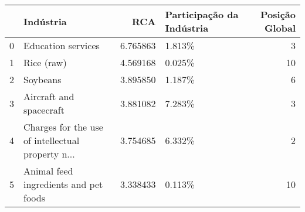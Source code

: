 \begin{tabular}{llrlr}
\toprule
{} &                                          Indústria &       RCA & Participação da Indústria &  Posição Global \\
\midrule
0 &                                 Education services &  6.765863 &                    1.813\% &               3 \\
1 &                                         Rice (raw) &  4.569168 &                    0.025\% &              10 \\
2 &                                           Soybeans &  3.895850 &                    1.187\% &               6 \\
3 &                            Aircraft and spacecraft &  3.881082 &                    7.283\% &               3 \\
4 &  Charges for the use of intellectual property n... &  3.754685 &                    6.332\% &               2 \\
5 &              Animal feed ingredients and pet foods &  3.338433 &                    0.113\% &              10 \\
\bottomrule
\end{tabular}

